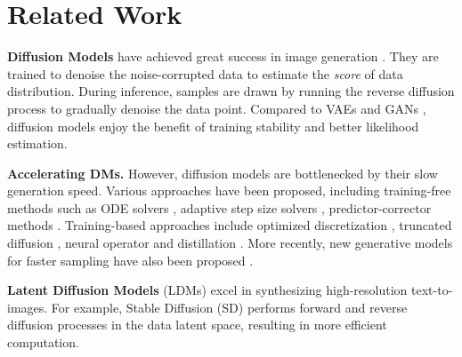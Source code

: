 \documentclass{article} %
\begin{document}

\vspace{-10pt}
\section{Related Work}
\vspace{-5pt}

\noindent \textbf{Diffusion Models} have achieved great success in image generation  \citep{ho2020denoising,song2020denoising,nichol2021improved,ramesh2022hierarchical,rombach2022high, song2019generative}.
They are trained to denoise the noise-corrupted data to estimate the {\em score} of data distribution.
During inference, samples are drawn by running the reverse diffusion process to gradually denoise the data point. Compared to VAEs \citep{kingma2013auto, sohn2015learning} and GANs \citep{goodfellow2020generative}, diffusion models enjoy the benefit of training stability and better likelihood estimation. 

\noindent \textbf{Accelerating DMs.} 
However, diffusion models are bottlenecked by their slow generation speed. Various approaches have been proposed, including training-free methods such as ODE solvers \citep{song2020denoising, lu2022dpm, lu2022dpm++}, adaptive step size solvers \citep{jolicoeur2021gotta}, predictor-corrector methods \citep{song2020score}. Training-based approaches include optimized discretization \citep{watson2021learning}, truncated diffusion \citep{lyu2022accelerating,zheng2022truncated}, neural operator \citep{zheng2023fast} and distillation \citep{salimans2022progressive,meng2023distillation}. More recently, new generative models for faster sampling have also been proposed \citep{liu2022flow,liu2023instaflow}.

\noindent \textbf{Latent Diffusion Models} (LDMs) \citep{rombach2022high} excel in synthesizing high-resolution text-to-images. For example, Stable Diffusion (SD) performs forward and reverse diffusion processes in the data latent space, resulting in more efficient computation. 
\end{document}
